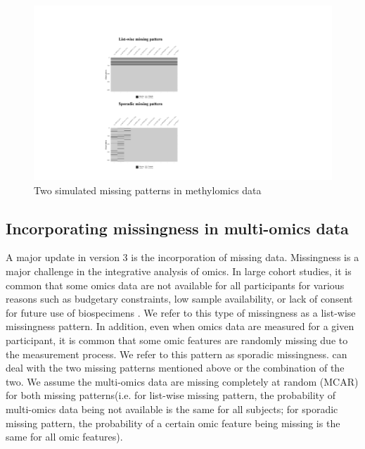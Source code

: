 \begin{figure}
    \centering
    \includegraphics[scale = 1.2]{figures/fig5.pdf}
    \caption{Two simulated missing patterns in methylomics data}
    \label{fig5}
\end{figure}

\subsection{Incorporating missingness in multi-omics data}
A major update in  version 3 is the incorporation of missing data. Missingness is a major challenge in the integrative analysis of omics. In large cohort studies, it is common that some omics data are not available for all participants for various reasons such as budgetary constraints, low sample availability, or lack of consent for future use of biospecimens \citep{voillet2016handling}. We refer to this type of missingness as a list-wise missingness pattern. In addition, even when omics data are measured for a given participant, it is common that some omic features are randomly missing due to the measurement process. We refer to this pattern as sporadic missingness.  can deal with the two missing patterns mentioned above or the combination of the two. We assume the multi-omics data are missing completely at random (MCAR) for both missing patterns(i.e. for list-wise missing pattern, the probability of multi-omics data being not available is the same for all subjects; for sporadic missing pattern, the probability of a certain omic feature being missing is the same for all omic features). 

